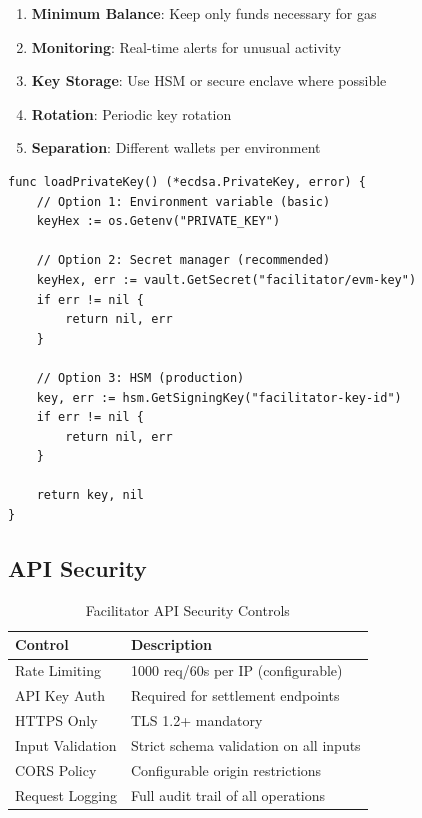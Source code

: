 \begin{enumerate}
    \item \textbf{Minimum Balance}: Keep only funds necessary for gas
    \item \textbf{Monitoring}: Real-time alerts for unusual activity
    \item \textbf{Key Storage}: Use HSM or secure enclave where possible
    \item \textbf{Rotation}: Periodic key rotation
    \item \textbf{Separation}: Different wallets per environment
\end{enumerate}

\begin{lstlisting}[language=golang,caption={Secure key loading example}]
func loadPrivateKey() (*ecdsa.PrivateKey, error) {
    // Option 1: Environment variable (basic)
    keyHex := os.Getenv("PRIVATE_KEY")

    // Option 2: Secret manager (recommended)
    keyHex, err := vault.GetSecret("facilitator/evm-key")
    if err != nil {
        return nil, err
    }

    // Option 3: HSM (production)
    key, err := hsm.GetSigningKey("facilitator-key-id")
    if err != nil {
        return nil, err
    }

    return key, nil
}
\end{lstlisting}

\subsection{API Security}

\begin{table}[htbp]
\centering
\caption{Facilitator API Security Controls}
\label{tab:api-security}
\begin{tabular}{lp{7cm}}
\toprule
\textbf{Control} & \textbf{Description} \\
\midrule
Rate Limiting & 1000 req/60s per IP (configurable) \\
API Key Auth & Required for settlement endpoints \\
HTTPS Only & TLS 1.2+ mandatory \\
Input Validation & Strict schema validation on all inputs \\
CORS Policy & Configurable origin restrictions \\
Request Logging & Full audit trail of all operations \\
\bottomrule
\end{tabular}
\end{table}

